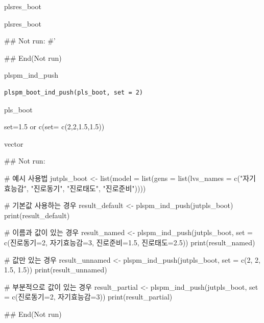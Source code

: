 \documentclass[a4paper]{book}
\begin{document}
%
\begin{Arguments}
\begin{ldescription}
\item[\code{plsres\_boot}] plsres\_boot
\end{ldescription}
\end{Arguments}
%
\begin{Value}
plsres\_boot
\end{Value}
%
\begin{Examples}
\begin{ExampleCode}
\#\# Not run: 
#'

## End(Not run)

\end{ExampleCode}
\end{Examples}
%
\begin{Description}
plspm\_ind\_push
\end{Description}
%
\begin{Usage}
\begin{verbatim}
plspm_boot_ind_push(pls_boot, set = 2)
\end{verbatim}
\end{Usage}
%
\begin{Arguments}
\begin{ldescription}
\item[\code{pls\_boot}] pls\_boot

\item[\code{set}] set=1.5 or c(set= c(2,2,1.5,1.5))
\end{ldescription}
\end{Arguments}
%
\begin{Value}
vector
\end{Value}
%
\begin{Examples}
\begin{ExampleCode}

\#\# Not run: 

# 예시 사용법
jutpls_boot <- list(model = list(gens = list(lvs_names = c("자기효능감", "진로동기", "진로태도", "진로준비"))))

# 기본값 사용하는 경우
result_default <- plspm_ind_push(jutpls_boot)
print(result_default)

# 이름과 값이 있는 경우
result_named <- plspm_ind_push(jutpls_boot, set = c(진로동기=2, 자기효능감=3, 진로준비=1.5, 진로태도=2.5))
print(result_named)

# 값만 있는 경우
result_unnamed <- plspm_ind_push(jutpls_boot, set = c(2, 2, 1.5, 1.5))
print(result_unnamed)

# 부분적으로 값이 있는 경우
result_partial <- plspm_ind_push(jutpls_boot, set = c(진로동기=2, 자기효능감=3))
print(result_partial)


## End(Not run)



\end{ExampleCode}
\end{Examples}
\end{document}
